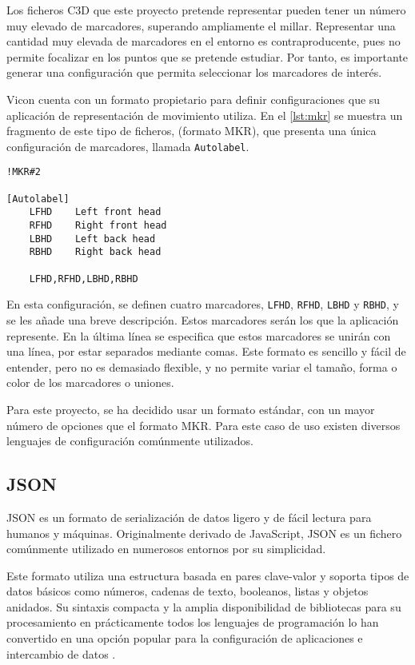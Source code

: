 Los ficheros \ac{C3D} que este proyecto pretende representar pueden tener un número muy elevado de marcadores, superando ampliamente el millar. Representar una cantidad muy elevada de marcadores en el entorno es contraproducente, pues no permite focalizar en los puntos que se pretende estudiar. Por tanto, es importante generar una configuración que permita seleccionar los marcadores de interés.

Vicon cuenta con un formato propietario para definir configuraciones que su aplicación de representación de movimiento utiliza. En el \autoref{lst:mkr} se muestra un fragmento de este tipo de ficheros, (formato MKR), que presenta una única configuración de marcadores, llamada \texttt{Autolabel}.

\begin{lstlisting}[style=mystyle, caption={Fragmento de un fichero MKR}, label=lst:mkr]
!MKR#2

[Autolabel]
	LFHD	Left front head
	RFHD	Right front head
	LBHD	Left back head
	RBHD	Right back head

    LFHD,RFHD,LBHD,RBHD
\end{lstlisting}

En esta configuración, se definen cuatro marcadores, \texttt{LFHD}, \texttt{RFHD}, \texttt{LBHD} y \texttt{RBHD}, y se les añade una breve descripción. Estos marcadores serán los que la aplicación represente. En la última línea se especifica que estos marcadores se unirán con una línea, por estar separados mediante comas. Este formato es sencillo y fácil de entender, pero no es demasiado flexible, y no permite variar el tamaño, forma o color de los marcadores o uniones.

Para este proyecto, se ha decidido usar un formato estándar, con un mayor número de opciones que el formato MKR. Para este caso de uso existen diversos lenguajes de configuración comúnmente utilizados.

\subsection{\acs{JSON}}

\ac{JSON} es un formato de serialización de datos ligero y de fácil lectura para humanos y máquinas. Originalmente derivado de JavaScript, \ac{JSON} es un fichero comúnmente utilizado en numerosos entornos por su simplicidad.

Este formato utiliza una estructura basada en pares clave-valor y soporta tipos de datos básicos como números, cadenas de texto, booleanos, listas y objetos anidados. Su sintaxis compacta y la amplia disponibilidad de bibliotecas para su procesamiento en prácticamente todos los lenguajes de programación lo han convertido en una opción popular para la configuración de aplicaciones e intercambio de datos \autocite{ECMA404}.


